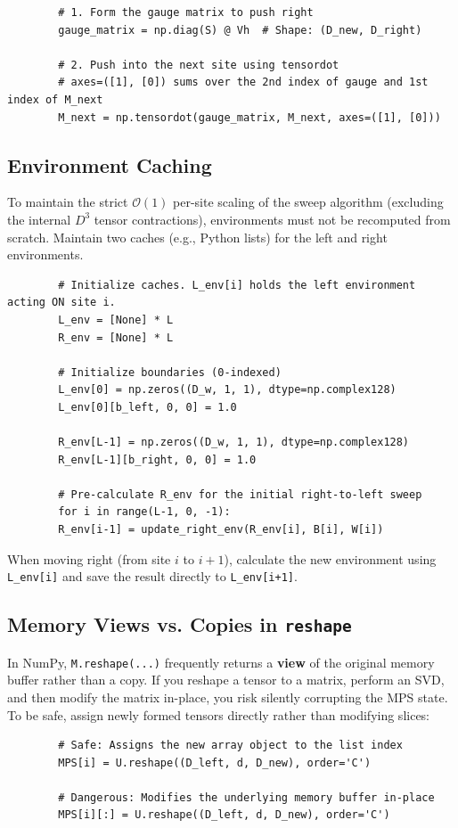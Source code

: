 \documentclass[aps,prb,onecolumn,scriptaddress]{revtex4-2}
\newcommand{\Order}{\mathcal{O}}
\begin{document}
	\begin{verbatim}
		# 1. Form the gauge matrix to push right
		gauge_matrix = np.diag(S) @ Vh  # Shape: (D_new, D_right)
		
		# 2. Push into the next site using tensordot
		# axes=([1], [0]) sums over the 2nd index of gauge and 1st index of M_next
		M_next = np.tensordot(gauge_matrix, M_next, axes=([1], [0])) 
	\end{verbatim}
	
	\subsection{Environment Caching}
	To maintain the strict $\Order(1)$ per-site scaling of the sweep algorithm (excluding the internal $D^3$ tensor contractions), environments must not be recomputed from scratch. Maintain two caches (e.g., Python lists) for the left and right environments. 
	
	\begin{verbatim}
		# Initialize caches. L_env[i] holds the left environment acting ON site i.
		L_env = [None] * L
		R_env = [None] * L
		
		# Initialize boundaries (0-indexed)
		L_env[0] = np.zeros((D_w, 1, 1), dtype=np.complex128)
		L_env[0][b_left, 0, 0] = 1.0
		
		R_env[L-1] = np.zeros((D_w, 1, 1), dtype=np.complex128)
		R_env[L-1][b_right, 0, 0] = 1.0
		
		# Pre-calculate R_env for the initial right-to-left sweep
		for i in range(L-1, 0, -1):
		R_env[i-1] = update_right_env(R_env[i], B[i], W[i])
	\end{verbatim}
	When moving right (from site $i$ to $i+1$), calculate the new environment using \texttt{L\_env[i]} and save the result directly to \texttt{L\_env[i+1]}.
	
	\subsection{Memory Views vs. Copies in \texttt{reshape}}
	In NumPy, \texttt{M.reshape(...)} frequently returns a \textbf{view} of the original memory buffer rather than a copy. If you reshape a tensor to a matrix, perform an SVD, and then modify the matrix in-place, you risk silently corrupting the MPS state. To be safe, assign newly formed tensors directly rather than modifying slices:
	
	\begin{verbatim}
		# Safe: Assigns the new array object to the list index
		MPS[i] = U.reshape((D_left, d, D_new), order='C') 
		
		# Dangerous: Modifies the underlying memory buffer in-place
		MPS[i][:] = U.reshape((D_left, d, D_new), order='C') 
	\end{verbatim}
	
\end{document}
